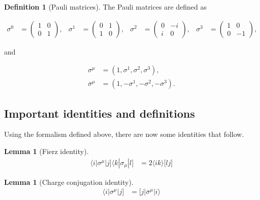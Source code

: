 \documentclass{article}
\theoremstyle{definition}
\newtheorem{definition}{Definition}[section]
\newtheorem{lemma}[theorem]{Lemma}
\numberwithin{equation}{section}
\begin{document}
\begin{definition}[Pauli matrices]

The Pauli matrices are defined as

\begin{align*}
    \sigma^0 &= 
    \begin{pmatrix}
        1 & 0 \\
        0 & 1
    \end{pmatrix}, &
    \sigma^1 &= 
    \begin{pmatrix}
        0 & 1 \\
        1 & 0
    \end{pmatrix}, &
    \sigma^2 &= 
    \begin{pmatrix}
        0 & -i \\
        i & 0
    \end{pmatrix}, &
    \sigma^3 &= 
    \begin{pmatrix}
        1 & 0 \\
        0 & -1
    \end{pmatrix},
\end{align*}

and

\begin{align*}
    \sigma^{\mu} &= (1, \sigma^1, \sigma^2, \sigma^3), \\
    \overline{\sigma}^{\mu} &= (1, -\sigma^1, -\sigma^2, -\sigma^3).
\end{align*}

\end{definition}

\subsection{Important identities and definitions}

Using the formalism defined above, there are now some identities that follow.

\begin{lemma}[Fierz identity]

\begin{align}
    \langle i | \sigma^{\mu} | j \rbrack \langle k | \sigma_{\mu} | l \rbrack &= 2 \langle ik \rangle \lbrack lj \rbrack \label{eq:fierz} 
\end{align}

\end{lemma}

\begin{lemma}[Charge conjugation identity]

\begin{align}
    \langle i | \sigma^{\mu} | j \rbrack &= \lbrack j | \overline{\sigma}^{\mu} | i \rangle \label{eq:ijji}
\end{align}

\end{lemma}
\end{document}
